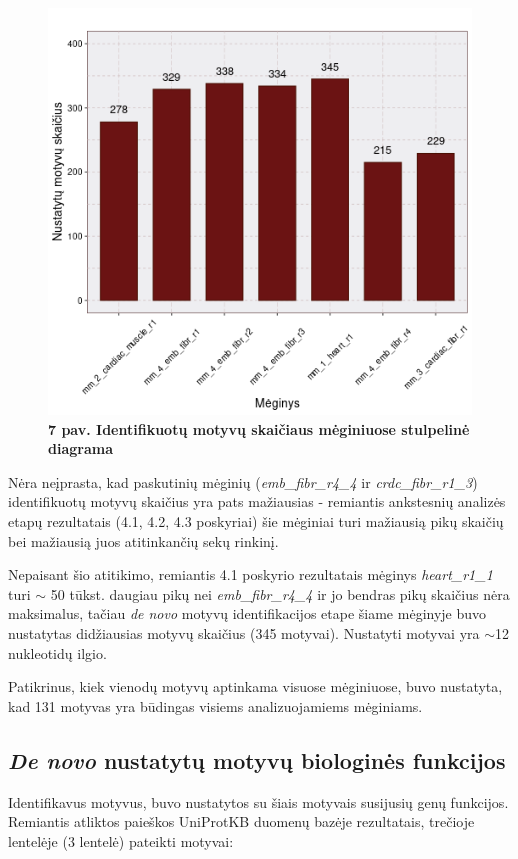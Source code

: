 \documentclass[12pt]{article}
\begin{document}
\begin{figure}[htb]
    \begin{center}
        \includegraphics[width=0.6\linewidth]{../Figures/motifs_in_samples.png}
        \vspace{-2\baselineskip}
        \caption*{\small\textbf{7 pav. Identifikuotų motyvų skaičiaus
                                mėginiuose stulpelinė diagrama}}
    \end{center}
\end{figure}

Nėra neįprasta, kad paskutinių mėginių (\small\emph{emb\_fibr\_r4\_4} ir
\small\emph{crdc\_fibr\_r1\_3}) identifikuotų motyvų skaičius yra pats
mažiausias - remiantis ankstesnių analizės etapų rezultatais (4.1, 4.2, 4.3
poskyriai) šie mėginiai turi mažiausią pikų skaičių bei mažiausią juos
atitinkančių sekų rinkinį.

Nepaisant šio atitikimo, remiantis 4.1 poskyrio rezultatais mėginys
\small\emph{heart\_r1\_1} turi \(\sim\) 50 tūkst. daugiau pikų nei
\small\emph{emb\_fibr\_r4\_4} ir jo bendras pikų skaičius nėra maksimalus,
tačiau \emph{de novo} motyvų identifikacijos etape šiame mėginyje buvo
nustatytas didžiausias motyvų skaičius (345 motyvai). Nustatyti motyvai yra
\(\sim\)12 nukleotidų ilgio.

Patikrinus, kiek vienodų motyvų aptinkama visuose mėginiuose, buvo nustatyta,
kad 131 motyvas yra būdingas visiems analizuojamiems mėginiams.

\subsection{\emph{De novo} nustatytų motyvų biologinės funkcijos}
Identifikavus motyvus, buvo nustatytos su šiais motyvais susijusių genų
funkcijos. Remiantis atliktos paieškos UniProtKB\cite{UNIPROTKB} duomenų
bazėje rezultatais, trečioje lentelėje (3 lentelė) pateikti motyvai:
\end{document}
